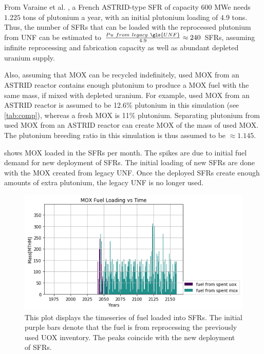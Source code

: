 From Varaine et al. \cite{varaine_pre-conceptual_2012}, a French
ASTRID-type \gls{SFR} of capacity 600 MWe needs $1.225$ tons of
plutonium a year, with an initial plutonium loading of $4.9$ tons. 
Thus, the number of \glspl{SFR} that can be loaded with the reprocessed
plutonium from \gls{UNF} can be estimated to $\frac{Pu \ from \ legacy \ \gls{UNF}}{4.9} \approx 240$ \glspl{SFR},
assuming infinite reprocessing and fabrication capacity as well as
abundant depleted uranium supply. 

Also, assuming that \gls{MOX} can be recycled indefinitely,
used \gls{MOX} from an ASTRID reactor contains enough plutonium to produce a \gls{MOX} fuel with
the same mass, if mixed with depleted uranium. For example,
used \gls{MOX} from an ASTRID reactor is assumed to be 12.6\% plutonium
in this simulation (see \cref{tab:comp}), whereas a fresh \gls{MOX} is 11\% plutonium.
Separating plutonium from used \gls{MOX} from
an ASTRID reactor can create \gls{MOX} of the mass of used \gls{MOX}.
The plutonium breeding ratio in this simulation is thus assumed to be
$\approx 1.145$.

 shows \gls{MOX} loaded in the \glspl{SFR} per month.
The spikes are due to initial fuel demand for new deployment of \glspl{SFR}.
The initial loading of new \glspl{SFR} are done with the \gls{MOX} created
from legacy \gls{UNF}. Once the deployed \glspl{SFR} create enough amounts
 of extra plutonium, the legacy \gls{UNF} is no longer used. 

\begin{figure}[htbp!]
	\begin{center}
		\includegraphics[scale=0.7]{./images/french-transition/where_fuel.png}
	\end{center}
	\caption{This plot displays the timeseries of fuel loaded into \glspl{SFR}.
			 The initial purple bars denote that the fuel is from reprocessing
			 the previously used \gls{UOX} inventory. The peaks coincide
			 with the new deployment of \glspl{SFR}.}
	\label{fig:fuel}
\end{figure}

